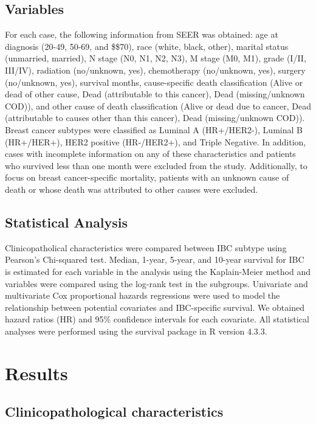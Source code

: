 \documentclass[
  letterpaper,
  DIV=11,
  numbers=noendperiod]{scrartcl}
\begin{document}
\subsection{Variables}\label{variables}

For each case, the following information from SEER was obtained: age at
diagnosis (20-49, 50-69, and \$\ge\$70), race (white, black, other),
marital status (unmarried, married), N stage (N0, N1, N2, N3), M stage
(M0, M1), grade (I/II, III/IV), radiation (no/unknown, yes),
chemotherapy (no/unknown, yes), surgery (no/unknown, yes), survival
months, cause-specific death classification (Alive or dead of other
cause, Dead (attributable to this cancer), Dead (missing/unknown COD)),
and other cause of death classification (Alive or dead due to cancer,
Dead (attributable to causes other than this cancer), Dead
(missing/unknown COD)). Breast cancer subtypes were classified as
Luminal A (HR+/HER2-), Luminal B (HR+/HER+), HER2 positive (HR-/HER2+),
and Triple Negative. In addition, cases with incomplete information on
any of these characteristics and patients who survived less than one
month were excluded from the study. Additionally, to focus on breast
cancer-specific mortality, patients with an unknown cause of death or
whose death was attributed to other causes were excluded.

\subsection{Statistical Analysis}\label{statistical-analysis}

Clinicopatholical characteristics were compared between IBC subtype
using Pearson's Chi-squared test. Median, 1-year, 5-year, and 10-year
survival for IBC is estimated for each variable in the analysis using
the Kaplain-Meier method and variables were compared using the log-rank
test in the subgroups. Univariate and multivariate Cox proportional
hazards regressions were used to model the relationship between
potential covariates and IBC-specific survival. We obtained hazard
ratios (HR) and 95\% confidence intervals for each covariate. All
statistical analyses were performed using the survival package in R
version 4.3.3.

\section{Results}\label{results}

\subsection{Clinicopathological
characteristics}\label{clinicopathological-characteristics}
\end{document}

